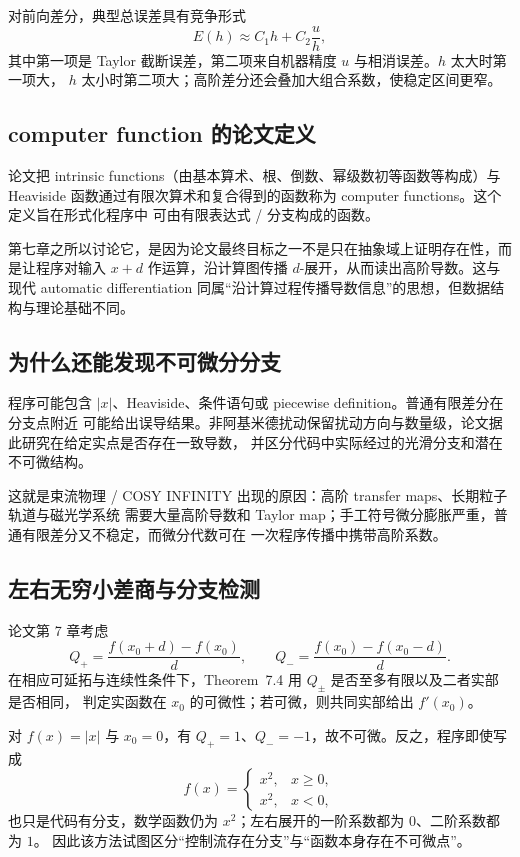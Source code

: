 \documentclass[11pt,a4paper]{article}
\theoremstyle{remark}
\begin{document}
对前向差分，典型总误差具有竞争形式
\[
E(h)\approx C_1h+C_2\frac{u}{h},
\]
其中第一项是 Taylor 截断误差，第二项来自机器精度 $u$ 与相消误差。$h$ 太大时第一项大，
$h$ 太小时第二项大；高阶差分还会叠加大组合系数，使稳定区间更窄。

\subsection{computer function 的论文定义}

论文把 intrinsic functions（由基本算术、根、倒数、幂级数初等函数等构成）与 Heaviside
函数通过有限次算术和复合得到的函数称为 computer functions。这个定义旨在形式化程序中
可由有限表达式 / 分支构成的函数。

第七章之所以讨论它，是因为论文最终目标之一不是只在抽象域上证明存在性，而是让程序对输入
$x+d$ 作运算，沿计算图传播 $d$-展开，从而读出高阶导数。这与现代 automatic differentiation
同属“沿计算过程传播导数信息”的思想，但数据结构与理论基础不同。

\subsection{为什么还能发现不可微分分支}

程序可能包含 $|x|$、Heaviside、条件语句或 piecewise definition。普通有限差分在分支点附近
可能给出误导结果。非阿基米德扰动保留扰动方向与数量级，论文据此研究在给定实点是否存在一致导数，
并区分代码中实际经过的光滑分支和潜在不可微结构。

这就是束流物理 / COSY INFINITY 出现的原因：高阶 transfer maps、长期粒子轨道与磁光学系统
需要大量高阶导数和 Taylor map；手工符号微分膨胀严重，普通有限差分又不稳定，而微分代数可在
一次程序传播中携带高阶系数。

\subsection{左右无穷小差商与分支检测}

论文第 7 章考虑
\[
Q_+=\frac{f(x_0+d)-f(x_0)}d,
\qquad
Q_-=\frac{f(x_0)-f(x_0-d)}d.
\]
在相应可延拓与连续性条件下，Theorem~7.4 用 $Q_\pm$ 是否至多有限以及二者实部是否相同，
判定实函数在 $x_0$ 的可微性；若可微，则共同实部给出 $f'(x_0)$。

对 $f(x)=|x|$ 与 $x_0=0$，有 $Q_+=1$、$Q_-=-1$，故不可微。反之，程序即使写成
\[
f(x)=\begin{cases}x^2,&x\ge0,\\x^2,&x<0,
\end{cases}
\]
也只是代码有分支，数学函数仍为 $x^2$；左右展开的一阶系数都为 $0$、二阶系数都为 $1$。
因此该方法试图区分“控制流存在分支”与“函数本身存在不可微点”。
\end{document}
